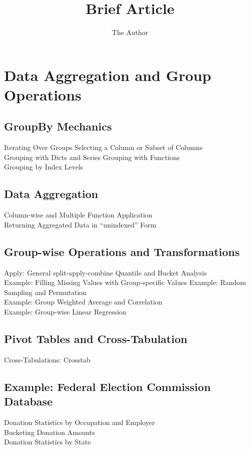 \documentclass[11pt]{article} %
\title{Brief Article}
\author{The Author}
\begin{document}
\section{Data Aggregation and Group Operations}
\subsection{GroupBy Mechanics}
Iterating Over Groups
Selecting a Column or Subset of Columns\\
Grouping with Dicts and Series
Grouping with Functions\\
Grouping by Index Levels
\subsection{Data Aggregation}
Column-wise and Multiple Function Application\\
Returning Aggregated Data in “unindexed” Form
\subsection{Group-wise Operations and Transformations}
Apply: General split-apply-combine
Quantile and Bucket Analysis\\
Example: Filling Missing Values with Group-specific Values
Example: Random Sampling and Permutation\\
Example: Group Weighted Average and Correlation\\
Example: Group-wise Linear Regression
\subsection{Pivot Tables and Cross-Tabulation}
Cross-Tabulations: Crosstab
\subsection{Example: Federal Election Commission Database}
Donation Statistics by Occupation and Employer\\
Bucketing Donation Amounts\\
Donation Statistics by State
\end{document}
